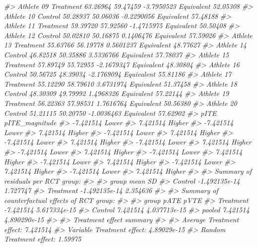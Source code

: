 \documentclass[
]{book}
\newenvironment{Shaded}{\begin{snugshade}}{\end{snugshade}}
\newcommand{\CommentTok}[1]{\textcolor[rgb]{0.56,0.35,0.01}{\textit{#1}}}
\begin{document}
\begin{Shaded}
\begin{Highlighting}[]
\CommentTok{\#>  Athlete 09 Treatment 63.26964  59.47459 {-}3.7950523 Equivalent       52.05308}
\CommentTok{\#>  Athlete 10   Control 50.28937  50.06036 {-}0.2290056 Equivalent       57.48188}
\CommentTok{\#>  Athlete 11 Treatment 59.39720  57.92560 {-}1.4715975 Equivalent       50.50408}
\CommentTok{\#>  Athlete 12   Control 50.02810  50.16875  0.1406476 Equivalent       57.59026}
\CommentTok{\#>  Athlete 13 Treatment 55.63766  56.19778  0.5601237 Equivalent       48.77627}
\CommentTok{\#>  Athlete 14   Control 46.82518  50.35886  3.5336766 Equivalent       57.78037}
\CommentTok{\#>  Athlete 15 Treatment 57.89749  55.72955 {-}2.1679347 Equivalent       48.30804}
\CommentTok{\#>  Athlete 16   Control 50.56725  48.39034 {-}2.1769094 Equivalent       55.81186}
\CommentTok{\#>  Athlete 17 Treatment 55.12290  58.79610  3.6731974 Equivalent       51.37458}
\CommentTok{\#>  Athlete 18   Control 48.30309  49.79992  1.4968326 Equivalent       57.22144}
\CommentTok{\#>  Athlete 19 Treatment 56.22363  57.98531  1.7616764 Equivalent       50.56380}
\CommentTok{\#>  Athlete 20   Control 51.21115  50.20750 {-}1.0036463 Equivalent       57.62902}
\CommentTok{\#>       pITE pITE\_magnitude}
\CommentTok{\#>  {-}7.421514          Lower}
\CommentTok{\#>   7.421514         Higher}
\CommentTok{\#>  {-}7.421514          Lower}
\CommentTok{\#>   7.421514         Higher}
\CommentTok{\#>  {-}7.421514          Lower}
\CommentTok{\#>   7.421514         Higher}
\CommentTok{\#>  {-}7.421514          Lower}
\CommentTok{\#>   7.421514         Higher}
\CommentTok{\#>  {-}7.421514          Lower}
\CommentTok{\#>   7.421514         Higher}
\CommentTok{\#>  {-}7.421514          Lower}
\CommentTok{\#>   7.421514         Higher}
\CommentTok{\#>  {-}7.421514          Lower}
\CommentTok{\#>   7.421514         Higher}
\CommentTok{\#>  {-}7.421514          Lower}
\CommentTok{\#>   7.421514         Higher}
\CommentTok{\#>  {-}7.421514          Lower}
\CommentTok{\#>   7.421514         Higher}
\CommentTok{\#>  {-}7.421514          Lower}
\CommentTok{\#>   7.421514         Higher}
\CommentTok{\#> }
\CommentTok{\#> Summary of residuals per RCT group:}
\CommentTok{\#> }
\CommentTok{\#>      group          mean       SD}
\CommentTok{\#>    Control {-}1.492135e{-}14 1.727747}
\CommentTok{\#>  Treatment {-}1.492135e{-}14 2.354636}
\CommentTok{\#> }
\CommentTok{\#> Summary of counterfactual effects of RCT group:}
\CommentTok{\#> }
\CommentTok{\#>      group      pATE         pVTE}
\CommentTok{\#>  Treatment {-}7.421514 5.617334e{-}15}
\CommentTok{\#>    Control  7.421514 4.037713e{-}15}
\CommentTok{\#>     pooled  7.421514 4.890290e{-}15}
\CommentTok{\#> }
\CommentTok{\#> Treatment effect summary}
\CommentTok{\#> }
\CommentTok{\#> Average Treatment effect:  7.421514}
\CommentTok{\#> Variable Treatment effect:  4.89029e{-}15}
\CommentTok{\#> Random Treatment effect:  1.59975}
\end{Highlighting}
\end{Shaded}
\end{document}
